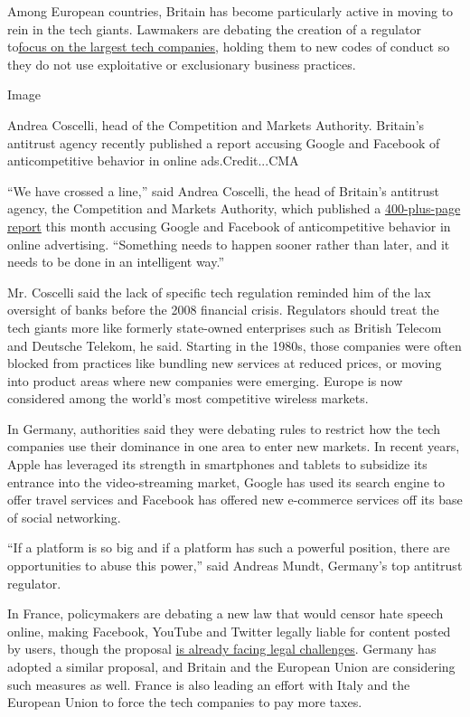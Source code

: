 Among European countries, Britain has become particularly active in
moving to rein in the tech giants. Lawmakers are debating the creation
of a regulator
to\href{https://www.gov.uk/government/news/new-regime-needed-to-take-on-tech-giants}{focus
on the largest tech companies}, holding them to new codes of conduct so
they do not use exploitative or exclusionary business practices.

Image

Andrea Coscelli, head of the Competition and Markets Authority.
Britain's antitrust agency recently published a report accusing Google
and Facebook of anticompetitive behavior in online ads.Credit...CMA

``We have crossed a line,'' said Andrea Coscelli, the head of Britain's
antitrust agency, the Competition and Markets Authority, which published
a
\href{https://www.gov.uk/cma-cases/online-platforms-and-digital-advertising-market-study}{400-plus-page
report} this month accusing Google and Facebook of anticompetitive
behavior in online advertising. ``Something needs to happen sooner
rather than later, and it needs to be done in an intelligent way.''

Mr. Coscelli said the lack of specific tech regulation reminded him of
the lax oversight of banks before the 2008 financial crisis. Regulators
should treat the tech giants more like formerly state-owned enterprises
such as British Telecom and Deutsche Telekom, he said. Starting in the
1980s, those companies were often blocked from practices like bundling
new services at reduced prices, or moving into product areas where new
companies were emerging. Europe is now considered among the world's most
competitive wireless markets.

In Germany, authorities said they were debating rules to restrict how
the tech companies use their dominance in one area to enter new markets.
In recent years, Apple has leveraged its strength in smartphones and
tablets to subsidize its entrance into the video-streaming market,
Google has used its search engine to offer travel services and Facebook
has offered new e-commerce services off its base of social networking.

``If a platform is so big and if a platform has such a powerful
position, there are opportunities to abuse this power,'' said Andreas
Mundt, Germany's top antitrust regulator.

In France, policymakers are debating a new law that would censor hate
speech online, making Facebook, YouTube and Twitter legally liable for
content posted by users, though the proposal
\href{https://www.nytimes3xbfgragh.onion/2020/06/18/world/europe/france-internet-hate-speech-regulation.html}{is
already facing legal challenges}. Germany has adopted a similar
proposal, and Britain and the European Union are considering such
measures as well. France is also leading an effort with Italy and the
European Union to force the tech companies to pay more taxes.

